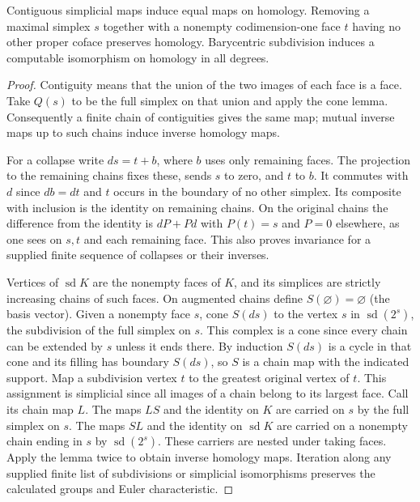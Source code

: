 \begin{theorem}\label{idx-algebraic250}
Contiguous simplicial maps induce equal maps on homology. Removing a
maximal simplex $s$ together with a nonempty codimension-one face $t$
having no other proper coface preserves homology. Barycentric subdivision
induces a computable isomorphism on homology in all degrees.
\end{theorem}
\begin{proof}
Contiguity means that the union of the two images of each face is a face.
Take $Q(s)$ to be the full simplex on that union and apply the cone
lemma. Consequently a finite chain of contiguities gives the same map;
mutual inverse maps up to such chains induce inverse homology maps.

For a collapse write $d s=t+b$, where $b$ uses only remaining faces.
The projection to the remaining chains fixes these, sends $s$ to zero,
and $t$ to $b$. It commutes with $d$ since $d b=d t$ and $t$ occurs
in the boundary of no other simplex. Its composite with inclusion is
the identity on remaining chains. On the original chains the difference
from the identity is $dP+Pd$ with $P(t)=s$ and $P=0$ elsewhere, as
one sees on $s,t$ and each remaining face. This also proves invariance
for a supplied finite sequence of collapses or their inverses.

Vertices of $\operatorname{sd}K$ are the nonempty faces of $K$, and
its simplices are strictly increasing chains of such faces. On augmented
chains define $S(\varnothing)=\varnothing$ (the basis vector).
Given a nonempty face $s$, cone $S(d s)$ to the vertex $s$ in
$\operatorname{sd}(2^s)$, the subdivision of the full simplex on $s$.
This complex is a cone since every chain can be extended by $s$ unless
it ends there. By induction $S(d s)$ is a cycle in that cone and its
filling has boundary $S(d s)$, so $S$ is a chain map with the indicated
support. Map a subdivision vertex $t$ to the greatest original vertex
of $t$. This assignment is simplicial since all images of a chain
belong to its largest face. Call its chain map $L$. The maps $LS$ and
the identity on $K$ are carried on $s$ by the full simplex on $s$.
The maps $SL$ and the identity on $\operatorname{sd}K$ are carried on
a nonempty chain ending in $s$ by $\operatorname{sd}(2^s)$.
These carriers are nested under taking faces. Apply the lemma twice to
obtain inverse homology maps. Iteration along any supplied finite list of
subdivisions or simplicial isomorphisms preserves the calculated groups
and Euler characteristic.
\end{proof}

